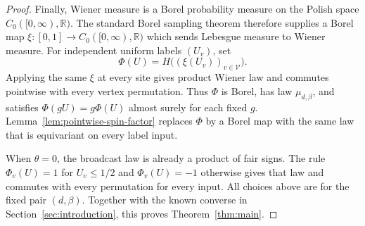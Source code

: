\begin{proof}
Finally, Wiener measure is a Borel probability measure on the Polish
space $C_0([0,\infty),\mathbb R)$. The standard Borel sampling
theorem therefore supplies a Borel map
$\xi:[0,1]\to C_0([0,\infty),\mathbb R)$ which sends Lebesgue measure
to Wiener measure. For independent uniform labels $(U_v)$, set
\[
 \Phi(U)=H\bigl((\xi(U_v))_{v\in\mathcal V}\bigr).
\]
Applying the same $\xi$ at every site gives product Wiener law and
commutes pointwise with every vertex permutation. Thus $\Phi$ is
Borel, has law $\mu_{d,\beta}$, and satisfies
$\Phi(gU)=g\Phi(U)$ almost surely for each fixed $g$.
Lemma~\ref{lem:pointwise-spin-factor} replaces $\Phi$ by a Borel map
with the same law that is equivariant on every label input.

When $\theta=0$, the broadcast law is already a product of fair signs.
The rule $\Phi_v(U)=1$ for $U_v\le1/2$ and $\Phi_v(U)=-1$ otherwise
gives that law and commutes with every permutation for every input.
All choices above are for the fixed pair $(d,\beta)$. Together with
the known converse in Section~\ref{sec:introduction}, this proves
Theorem~\ref{thm:main}.
\end{proof}
